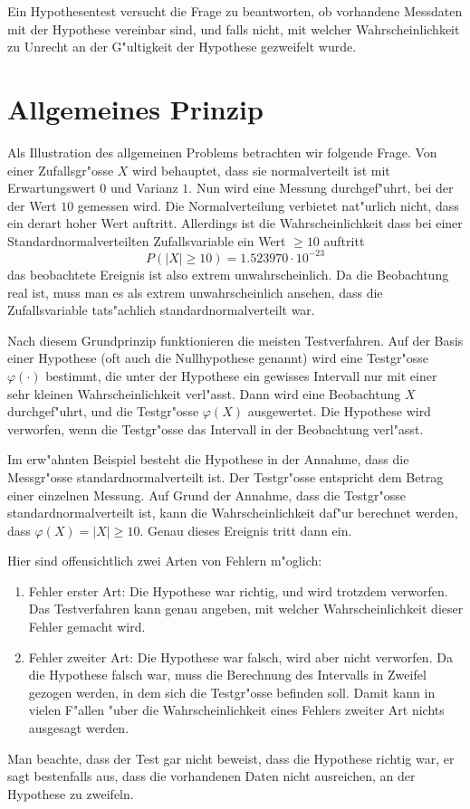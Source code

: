 Ein Hypothesentest versucht die Frage zu beantworten, ob vorhandene
Messdaten mit der Hypothese vereinbar sind, und falls nicht, mit welcher
Wahrscheinlichkeit zu Unrecht an der G"ultigkeit der Hypothese gezweifelt
wurde.

\section{Allgemeines Prinzip}
Als Illustration des allgemeinen Problems betrachten wir folgende Frage.
Von einer Zufallsgr"osse $X$ wird behauptet, dass sie normalverteilt ist
mit Erwartungswert $0$ und Varianz $1$.
Nun wird eine Messung durchgef"uhrt, bei der der Wert $10$ gemessen wird.
Die Normalverteilung verbietet nat"urlich
nicht, dass ein derart hoher Wert auftritt.
Allerdings ist die
Wahrscheinlichkeit dass bei einer Standardnormalverteilten Zufallsvariable
ein Wert $\ge 10$ auftritt
\[
P(|X|\ge 10)=1.523970\cdot 10^{-23}
\]
das beobachtete Ereignis ist also extrem unwahrscheinlich.
Da die Beobachtung
real ist, muss man es als extrem unwahrscheinlich ansehen, dass die
Zufallsvariable tats"achlich standardnormalverteilt war.

Nach diesem Grundprinzip funktionieren die meisten Testverfahren.
Auf der Basis einer Hypothese (oft auch die Nullhypothese genannt)
wird eine Testgr"osse $\varphi(\cdot)$ bestimmt, die 
unter der Hypothese ein gewisses Intervall nur mit einer sehr kleinen
Wahrscheinlichkeit verl"asst.
Dann wird eine Beobachtung $X$ durchgef"uhrt, und die Testgr"osse
$\varphi(X)$ ausgewertet.
Die Hypothese wird verworfen, wenn die
Testgr"osse das Intervall in der Beobachtung verl"asst.

Im erw"ahnten Beispiel besteht die Hypothese in der Annahme, dass die
Messgr"osse standardnormalverteilt ist.
Der Testgr"osse entspricht dem Betrag einer einzelnen Messung.
Auf Grund der Annahme, dass die Testgr"osse
standardnormalverteilt ist, kann die Wahrscheinlichkeit daf"ur berechnet
werden, dass $\varphi(X)=|X|\ge10$.
Genau dieses Ereignis tritt dann ein.

Hier sind offensichtlich zwei Arten von Fehlern m"oglich:
\begin{enumerate}
\item Fehler erster Art: Die Hypothese war richtig, und wird trotzdem verworfen.
Das Testverfahren kann genau angeben, mit welcher Wahrscheinlichkeit
dieser Fehler gemacht wird.
\item Fehler zweiter Art: Die Hypothese war falsch, wird aber nicht verworfen.
Da die Hypothese falsch war, muss die Berechnung des Intervalls in Zweifel
gezogen werden, in dem sich die Testgr"osse befinden soll.
Damit kann
in vielen F"allen "uber die Wahrscheinlichkeit eines Fehlers zweiter
Art nichts ausgesagt werden.
\end{enumerate}
Man beachte, dass der Test gar nicht beweist, dass die Hypothese richtig
war, er sagt bestenfalls aus, dass die vorhandenen Daten nicht ausreichen,
an der Hypothese zu zweifeln.

